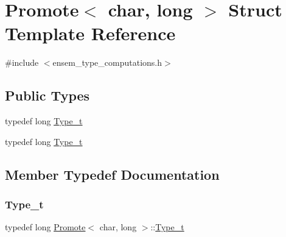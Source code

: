 \hypertarget{structPromote_3_01char_00_01long_01_4}{}\section{Promote$<$ char, long $>$ Struct Template Reference}
\label{structPromote_3_01char_00_01long_01_4}


{\ttfamily \#include $<$ensem\+\_\+type\+\_\+computations.\+h$>$}

\subsection*{Public Types}
\begin{DoxyCompactItemize}
\item 
typedef long \mbox{\hyperlink{structPromote_3_01char_00_01long_01_4_a1f06e3372fb9659a4cba391658ec5883}{Type\+\_\+t}}
\item 
typedef long \mbox{\hyperlink{structPromote_3_01char_00_01long_01_4_a1f06e3372fb9659a4cba391658ec5883}{Type\+\_\+t}}
\end{DoxyCompactItemize}


\subsection{Member Typedef Documentation}
\mbox{\label{structPromote_3_01char_00_01long_01_4_a1f06e3372fb9659a4cba391658ec5883}} 
\subsubsection{\texorpdfstring{Type\_t}{Type\_t}\hspace{0.1cm}{\footnotesize\ttfamily [1/2]}}
{\footnotesize\ttfamily typedef long \mbox{\hyperlink{structPromote}{Promote}}$<$ char, long $>$\+::\mbox{\hyperlink{structPromote_3_01char_00_01long_01_4_a1f06e3372fb9659a4cba391658ec5883}{Type\+\_\+t}}}

\mbox{\label{structPromote_3_01char_00_01long_01_4_a1f06e3372fb9659a4cba391658ec5883}} 
